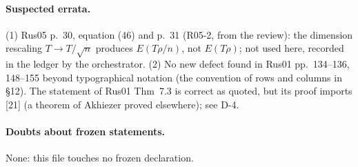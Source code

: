 \paragraph{Suspected errata.} (1) Rus05 p.~30, equation (46) and p.~31 (R05-2, from the review): the dimension rescaling $T\to T/\sqrt n$ produces $E(T\rho/n)$, not $E(T\rho)$; not used here, recorded in the ledger by the orchestrator. (2) No new defect found in Rus01 pp.~134--136, 148--155 beyond typographical notation (the convention of rows and columns in \S12). The statement of Rus01 Thm~7.3 is correct as quoted, but its proof imports [21] (a theorem of Akhiezer proved elsewhere); see D-4.

\paragraph{Doubts about frozen statements.} None: this file touches no frozen declaration.

